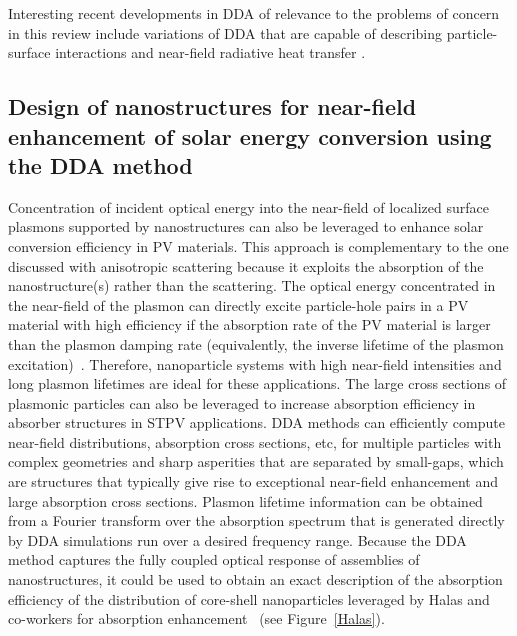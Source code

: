\documentclass[review]{elsarticle}
\begin{document}
Interesting recent developments in DDA of relevance to the problems of concern in this review include
variations of DDA that are capable of describing particle-surface interactions \cite{loke2010}
and near-field radiative heat transfer \cite{edalatpour2014}.

\subsection{Design of nanostructures for near-field enhancement of solar energy conversion using the DDA method  }

Concentration of incident optical energy into the near-field of localized surface plasmons supported by nanostructures can also be leveraged to enhance
solar conversion efficiency in PV materials.  This approach is complementary to the one discussed with anisotropic scattering because it
exploits the absorption of the nanostructure(s) rather than the scattering.  The optical energy concentrated in the near-field of the
plasmon can directly excite particle-hole pairs in a PV material with high efficiency if the absorption rate of the PV material is 
larger than the plasmon damping rate (equivalently, the inverse lifetime of the plasmon excitation)~\cite{AP_NatMat_2010}.  Therefore, nanoparticle systems with
high near-field intensities and long plasmon lifetimes are ideal for these applications.  The large cross sections of plasmonic particles
can also be leveraged to increase absorption efficiency in absorber structures in STPV applications.  DDA methods can efficiently compute
near-field distributions, absorption cross sections, etc, for multiple particles with complex geometries and sharp asperities that are separated by small-gaps,
which are structures that typically give rise to exceptional near-field enhancement and large absorption cross sections.  
Plasmon lifetime information can be obtained
from a Fourier transform over the absorption spectrum that is generated directly by DDA simulations run over a desired frequency range.
Because the DDA method captures the fully coupled optical response of assemblies of nanostructures, it could be used to obtain 
an exact description of the absorption efficiency of the distribution of core-shell nanoparticles leveraged by Halas and co-workers
for absorption enhancement~\cite{CH_APL_2006} (see Figure~\ref{Halas}).
\end{document}
